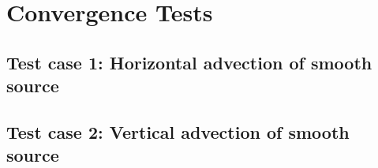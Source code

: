 %
\clearpage
\section{Convergence Tests}

\subsection{Test case 1: Horizontal advection of smooth source}
\clearpage
\subsection{Test case 2: Vertical advection of smooth source}
\clearpage
